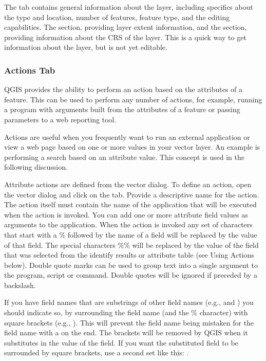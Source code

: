 The  tab contains general information about the layer,
including specifics about the type and location, number of features, feature
type, and the editing capabilities. The  section,
providing
layer extent information, and the 
section, providing information about the CRS of the layer. This is a quick
way to get information about the layer, but is not yet editable.

\subsubsection{Actions Tab}\label{label_actions}

QGIS provides the ability to perform an action based on the attributes of a
feature. This can be used to perform any number of actions, for example,
running a program with arguments built from the attributes of a feature or
passing parameters to a web reporting tool.

Actions are useful when you frequently want to run an external application or
view a web page based on one or more values in your vector layer. An example
is performing a search based on an attribute value. This concept is used in 
the following discussion.


Attribute actions are defined from the vector  dialog. To
define an action, open the vector  dialog and click on the
 tab. Provide a descriptive name for the action. The action
itself must contain the name of the application that will be executed when the
action is invoked. You can add one or more attribute field values as arguments
to the application. When the action is invoked any set of characters that
start with a \% followed by the name of a field will be replaced by the value of
that field. The special characters \%\% \index{\%\%}will be replaced by the value
of the field that was selected from the identify results or attribute table (see
Using Actions below).  Double quote marks can be used to group text into a
single argument to the program, script or command. Double quotes will be
ignored if preceded by a backslash.

If you have field names that are substrings of other field names (e.g., 
and ) you should
indicate so, by surrounding the field name (and the \% character) with square
brackets (e.g., \usertext{[\%col10]}). This will prevent the  field
name being mistaken for the  field name with a 
on the end. The brackets will be removed by QGIS when it substitutes in the
value of the field. If you want the substituted field to be surrounded by square
brackets, use a second set like this: \usertext{[[\%col10]]}.


